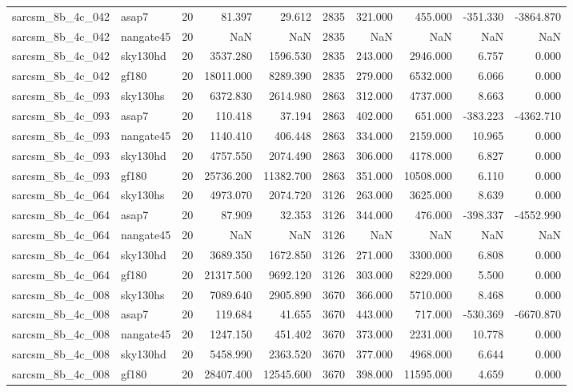 \begin{longtable}{llrrrrrrrr}
sarcsm\_8b\_4c\_042 & asap7 & 20 & 81.397 & 29.612 & 2835 & 321.000 & 455.000 & -351.330 & -3864.870 \\
sarcsm\_8b\_4c\_042 & nangate45 & 20 & NaN & NaN & 2835 & NaN & NaN & NaN & NaN \\
sarcsm\_8b\_4c\_042 & sky130hd & 20 & 3537.280 & 1596.530 & 2835 & 243.000 & 2946.000 & 6.757 & 0.000 \\
sarcsm\_8b\_4c\_042 & gf180 & 20 & 18011.000 & 8289.390 & 2835 & 279.000 & 6532.000 & 6.066 & 0.000 \\
sarcsm\_8b\_4c\_093 & sky130hs & 20 & 6372.830 & 2614.980 & 2863 & 312.000 & 4737.000 & 8.663 & 0.000 \\
sarcsm\_8b\_4c\_093 & asap7 & 20 & 110.418 & 37.194 & 2863 & 402.000 & 651.000 & -383.223 & -4362.710 \\
sarcsm\_8b\_4c\_093 & nangate45 & 20 & 1140.410 & 406.448 & 2863 & 334.000 & 2159.000 & 10.965 & 0.000 \\
sarcsm\_8b\_4c\_093 & sky130hd & 20 & 4757.550 & 2074.490 & 2863 & 306.000 & 4178.000 & 6.827 & 0.000 \\
sarcsm\_8b\_4c\_093 & gf180 & 20 & 25736.200 & 11382.700 & 2863 & 351.000 & 10508.000 & 6.110 & 0.000 \\
sarcsm\_8b\_4c\_064 & sky130hs & 20 & 4973.070 & 2074.720 & 3126 & 263.000 & 3625.000 & 8.639 & 0.000 \\
sarcsm\_8b\_4c\_064 & asap7 & 20 & 87.909 & 32.353 & 3126 & 344.000 & 476.000 & -398.337 & -4552.990 \\
sarcsm\_8b\_4c\_064 & nangate45 & 20 & NaN & NaN & 3126 & NaN & NaN & NaN & NaN \\
sarcsm\_8b\_4c\_064 & sky130hd & 20 & 3689.350 & 1672.850 & 3126 & 271.000 & 3300.000 & 6.808 & 0.000 \\
sarcsm\_8b\_4c\_064 & gf180 & 20 & 21317.500 & 9692.120 & 3126 & 303.000 & 8229.000 & 5.500 & 0.000 \\
sarcsm\_8b\_4c\_008 & sky130hs & 20 & 7089.640 & 2905.890 & 3670 & 366.000 & 5710.000 & 8.468 & 0.000 \\
sarcsm\_8b\_4c\_008 & asap7 & 20 & 119.684 & 41.655 & 3670 & 443.000 & 717.000 & -530.369 & -6670.870 \\
sarcsm\_8b\_4c\_008 & nangate45 & 20 & 1247.150 & 451.402 & 3670 & 373.000 & 2231.000 & 10.778 & 0.000 \\
sarcsm\_8b\_4c\_008 & sky130hd & 20 & 5458.990 & 2363.520 & 3670 & 377.000 & 4968.000 & 6.644 & 0.000 \\
sarcsm\_8b\_4c\_008 & gf180 & 20 & 28407.400 & 12545.600 & 3670 & 398.000 & 11595.000 & 4.659 & 0.000 \\

\end{longtable}
